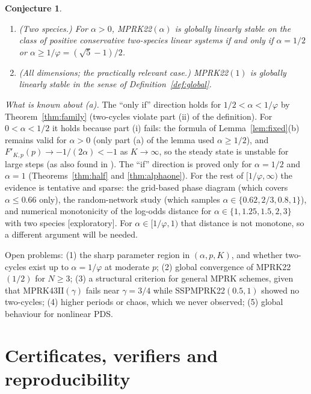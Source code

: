 \documentclass[11pt,a4paper]{article}
\theoremstyle{plain}
\newtheorem{conjecture}[theorem]{Conjecture}
\theoremstyle{definition}
\newcommand{\status}[1]{\textsf{[#1]}}
\begin{document}
\begin{conjecture}\label{conj:refined}
\begin{enumerate}[label=(\alph*),itemsep=1pt]
\item \emph{(Two species.)} For $\alpha>0$, MPRK22$(\alpha)$ is globally linearly stable on the class of positive conservative two-species linear systems if and only if $\alpha=1/2$ or $\alpha\ge1/\varphi=(\sqrt5-1)/2$.
\item \emph{(All dimensions; the practically relevant case.)} MPRK22$(1)$ is globally linearly stable in the sense of Definition~\ref{def:global}.
\end{enumerate}
\end{conjecture}

\emph{What is known about (a).} The ``only if'' direction holds for $1/2<\alpha<1/\varphi$ by Theorem~\ref{thm:family} (two-cycles violate part (ii) of the definition). For $0<\alpha<1/2$ it holds because part (i) fails: the formula of Lemma~\ref{lem:fixed}(b) remains valid for $\alpha>0$ (only part (a) of the lemma used $\alpha\ge1/2$), and $F'_{K,p}(p)\to-1/(2\alpha)<-1$ as $K\to\infty$, so the steady state is unstable for large steps (as also found in \cite{IKMS2024}). The ``if'' direction is proved only for $\alpha=1/2$ and $\alpha=1$ (Theorems~\ref{thm:half} and \ref{thm:alphaone}). For the rest of $[1/\varphi,\infty)$ the evidence is tentative and sparse: the grid-based phase diagram (which covers $\alpha\le0.66$ only), the random-network study (which samples $\alpha\in\{0.62,2/3,0.8,1\}$), and numerical monotonicity of the log-odds distance for $\alpha\in\{1,1.25,1.5,2,3\}$ with two species \status{exploratory}. For $\alpha\in[1/\varphi,1)$ that distance is not monotone, so a different argument will be needed.

Open problems: (1) the sharp parameter region in $(\alpha,p,K)$, and whether two-cycles exist up to $\alpha=1/\varphi$ at moderate $p$; (2) global convergence of MPRK22$(1/2)$ for $N\ge3$; (3) a structural criterion for general MPRK schemes, given that MPRK43II$(\gamma)$ fails near $\gamma=3/4$ while SSPMPRK22$(0.5,1)$ showed no two-cycles; (4) higher periods or chaos, which we never observed; (5) global behaviour for nonlinear PDS.

\section{Certificates, verifiers and reproducibility}\label{sec:repro}
\end{document}
